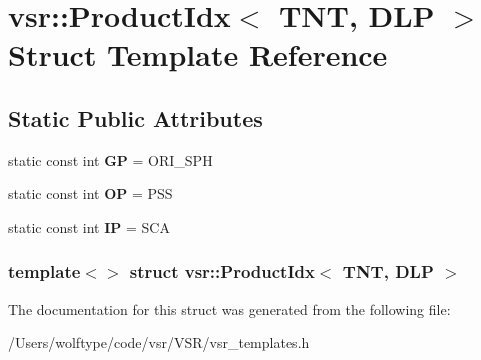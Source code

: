 \hypertarget{structvsr_1_1_product_idx_3_01_t_n_t_00_01_d_l_p_01_4}{\section{vsr\-:\-:Product\-Idx$<$ T\-N\-T, D\-L\-P $>$ Struct Template Reference}
\label{structvsr_1_1_product_idx_3_01_t_n_t_00_01_d_l_p_01_4}
}
\subsection*{Static Public Attributes}
\begin{DoxyCompactItemize}
\item 
\hypertarget{structvsr_1_1_product_idx_3_01_t_n_t_00_01_d_l_p_01_4_a071e94c85b5f12459ff26c0eb7a6cc2e}{static const int {\bfseries G\-P} = O\-R\-I\-\_\-\-S\-P\-H}\label{structvsr_1_1_product_idx_3_01_t_n_t_00_01_d_l_p_01_4_a071e94c85b5f12459ff26c0eb7a6cc2e}

\item 
\hypertarget{structvsr_1_1_product_idx_3_01_t_n_t_00_01_d_l_p_01_4_a439c4ba9c246cece200abc2008f48420}{static const int {\bfseries O\-P} = P\-S\-S}\label{structvsr_1_1_product_idx_3_01_t_n_t_00_01_d_l_p_01_4_a439c4ba9c246cece200abc2008f48420}

\item 
\hypertarget{structvsr_1_1_product_idx_3_01_t_n_t_00_01_d_l_p_01_4_a6f05ef2b20689ded0b4b8f0a88042375}{static const int {\bfseries I\-P} = S\-C\-A}\label{structvsr_1_1_product_idx_3_01_t_n_t_00_01_d_l_p_01_4_a6f05ef2b20689ded0b4b8f0a88042375}

\end{DoxyCompactItemize}
\subsubsection*{template$<$$>$ struct vsr\-::\-Product\-Idx$<$ T\-N\-T, D\-L\-P $>$}



The documentation for this struct was generated from the following file\-:\begin{DoxyCompactItemize}
\item 
/\-Users/wolftype/code/vsr/\-V\-S\-R/vsr\-\_\-templates.\-h\end{DoxyCompactItemize}
